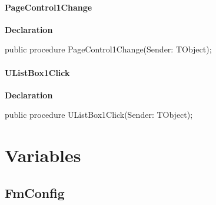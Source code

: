 \documentclass{report}
\newif\ifpdf
\begin{document}
\paragraph*{PageControl1Change}\hspace*{\fill}

\label{settings.TFmConfig-PageControl1Change}
\begin{list}{}{
\setlength{\itemindent}{0cm}
\setlength{\listparindent}{0cm}
\setlength{\leftmargin}{\evensidemargin}
\addtolength{\leftmargin}{\tmplength}
\settowidth{\labelsep}{X}
\addtolength{\leftmargin}{\labelsep}
\setlength{\labelwidth}{\tmplength}
}
\item[\textbf{Declaration}\hfill]
\ifpdf
\begin{flushleft}
\fi
\begin{ttfamily}
public procedure PageControl1Change(Sender: TObject);\end{ttfamily}

\ifpdf
\end{flushleft}
\fi

\end{list}
\paragraph*{UListBox1Click}\hspace*{\fill}

\label{settings.TFmConfig-UListBox1Click}
\begin{list}{}{
\setlength{\itemindent}{0cm}
\setlength{\listparindent}{0cm}
\setlength{\leftmargin}{\evensidemargin}
\addtolength{\leftmargin}{\tmplength}
\settowidth{\labelsep}{X}
\addtolength{\leftmargin}{\labelsep}
\setlength{\labelwidth}{\tmplength}
}
\item[\textbf{Declaration}\hfill]
\ifpdf
\begin{flushleft}
\fi
\begin{ttfamily}
public procedure UListBox1Click(Sender: TObject);\end{ttfamily}

\ifpdf
\end{flushleft}
\fi

\end{list}
\section{Variables}
\ifpdf
\subsection*{\large{\textbf{FmConfig}}\normalsize\hspace{1ex}\hrulefill}
\else
\end{document}
